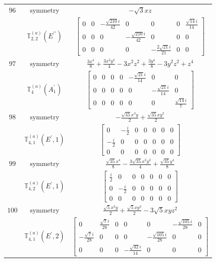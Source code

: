 \documentclass[fleqn,8pt,landscape]{jsarticle}
\begin{document}
\begin{longtable}{ccc}
$ 96 $ & $ \text{symmetry} $ & $ - \sqrt{3} x z $ \\
$  $ & $ \mathbb{T}_{2,2}^{(a)}(E^{\prime\prime}) $ & $ \begin{bmatrix} 0 & 0 & - \frac{\sqrt{210} i}{42} & 0 & 0 & 0 & \frac{\sqrt{14} i}{14} \\ 0 & 0 & 0 & - \frac{\sqrt{210} i}{42} & 0 & 0 & 0 \\ 0 & 0 & 0 & 0 & - \frac{2 \sqrt{21} i}{21} & 0 & 0 \end{bmatrix} $ \\ \hline
$ 97 $ & $ \text{symmetry} $ & $ \frac{3 x^{4}}{8} + \frac{3 x^{2} y^{2}}{4} - 3 x^{2} z^{2} + \frac{3 y^{4}}{8} - 3 y^{2} z^{2} + z^{4} $ \\
$  $ & $ \mathbb{T}_{4}^{(a)}(A_{1}^{\prime}) $ & $ \begin{bmatrix} 0 & 0 & 0 & 0 & - \frac{\sqrt{21} i}{14} & 0 & 0 \\ 0 & 0 & 0 & 0 & 0 & - \frac{\sqrt{21} i}{14} & 0 \\ 0 & 0 & 0 & 0 & 0 & 0 & \frac{\sqrt{14} i}{7} \end{bmatrix} $ \\ \hline
$ 98 $ & $ \text{symmetry} $ & $ - \frac{\sqrt{35} x^{3} y}{2} + \frac{\sqrt{35} x y^{3}}{2} $ \\
$  $ & $ \mathbb{T}_{4,1}^{(a)}(E^{\prime},1) $ & $ \begin{bmatrix} 0 & - \frac{i}{2} & 0 & 0 & 0 & 0 & 0 \\ - \frac{i}{2} & 0 & 0 & 0 & 0 & 0 & 0 \\ 0 & 0 & 0 & 0 & 0 & 0 & 0 \end{bmatrix} $ \\ \hline
$ 99 $ & $ \text{symmetry} $ & $ \frac{\sqrt{35} x^{4}}{8} - \frac{3 \sqrt{35} x^{2} y^{2}}{4} + \frac{\sqrt{35} y^{4}}{8} $ \\
$  $ & $ \mathbb{T}_{4,2}^{(a)}(E^{\prime},1) $ & $ \begin{bmatrix} \frac{i}{2} & 0 & 0 & 0 & 0 & 0 & 0 \\ 0 & - \frac{i}{2} & 0 & 0 & 0 & 0 & 0 \\ 0 & 0 & 0 & 0 & 0 & 0 & 0 \end{bmatrix} $ \\ \hline
$ 100 $ & $ \text{symmetry} $ & $ \frac{\sqrt{5} x^{3} y}{2} + \frac{\sqrt{5} x y^{3}}{2} - 3 \sqrt{5} x y z^{2} $ \\
$  $ & $ \mathbb{T}_{4,1}^{(a)}(E^{\prime},2) $ & $ \begin{bmatrix} 0 & \frac{\sqrt{7} i}{28} & 0 & 0 & 0 & - \frac{\sqrt{105} i}{28} & 0 \\ - \frac{\sqrt{7} i}{28} & 0 & 0 & 0 & - \frac{\sqrt{105} i}{28} & 0 & 0 \\ 0 & 0 & 0 & - \frac{\sqrt{42} i}{14} & 0 & 0 & 0 \end{bmatrix} $ \\ \hline

\end{longtable}
\end{document}
